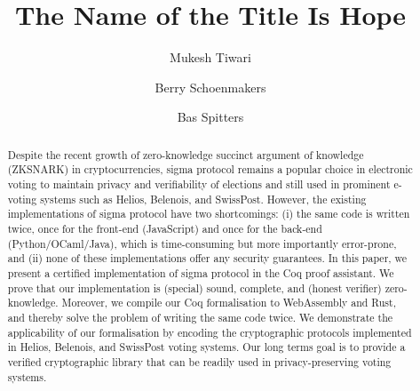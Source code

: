 \documentclass[sigconf]{acmart}
\begin{document}
\title{The Name of the Title Is Hope}


\author{Mukesh Tiwari}

\author{Berry Schoenmakers}


\author{Bas Spitters}

\renewcommand{\shortauthors}{Tiwari et al.}

\begin{abstract}
  Despite the recent growth of zero-knowledge succinct argument 
  of knowledge (ZKSNARK) in cryptocurrencies, 
  sigma protocol remains a popular choice in electronic voting to maintain privacy 
  and verifiability of elections and still used in prominent e-voting systems such as 
  Helios, Belenois, and SwissPost. However, 
  the existing implementations of sigma protocol have two 
  shortcomings: (i) the same code is written twice, once for the front-end (JavaScript)
  and once for the back-end (Python/OCaml/Java), which is time-consuming but more importantly error-prone, 
  and (ii) none of these implementations offer any security guarantees. 
  In this paper, we present a certified implementation of sigma protocol in the Coq proof assistant. 
  We prove that our implementation is (special) sound, complete, and 
  (honest verifier) zero-knowledge. Moreover, 
  we compile our Coq formalisation to WebAssembly and Rust, and 
  thereby solve the problem of writing the same code twice. 
  We demonstrate the applicability of our
  formalisation by encoding the cryptographic protocols implemented in 
  Helios, Belenois, and SwissPost voting systems. 
  Our long terms goal is to provide a verified cryptographic library that can be 
  readily used in privacy-preserving voting systems.


\end{abstract}
\end{document}
